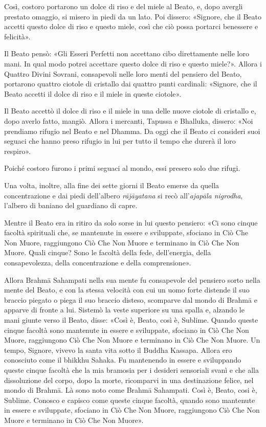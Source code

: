 Così, costoro portarono un dolce di riso e del miele al Beato, e, dopo avergli
prestato omaggio, si misero in piedi da un lato. Poi dissero: «Signore, che il
Beato accetti questo dolce di riso e questo miele, così che ciò possa portarci
benessere e felicità».

Il Beato pensò: «Gli Esseri Perfetti non accettano cibo direttamente nelle loro
mani. In qual modo potrei accettare questo dolce di riso e questo miele?».
Allora i Quattro Divini Sovrani, consapevoli nelle loro menti del pensiero del
Beato, portarono quattro ciotole di cristallo dai quattro punti cardinali:
«Signore, che il Beato accetti il dolce di riso e il miele in queste ciotole».

Il Beato accettò il dolce di riso e il miele in una delle nuove ciotole di
cristallo e, dopo averlo fatto, mangiò. Allora i mercanti, Tapussa e Bhalluka,
dissero: «Noi prendiamo rifugio nel Beato e nel Dhamma. Da oggi che il Beato ci
consideri suoi seguaci che hanno preso rifugio in lui per tutto il tempo che
durerà il loro respiro».

Poiché costoro furono i primi seguaci al mondo, essi presero solo due rifugi.


 Una volta, inoltre, alla fine dei sette giorni il Beato
emerse da quella concentrazione e dai piedi dell’albero \emph{rājāyatana} si
recò all’\emph{ajapāla nigrodha}, l’albero di baniano del guardiano di capre.

 Mentre il Beato era in ritiro da solo sorse in lui questo
pensiero: «Ci sono cinque facoltà spirituali che, se mantenute in essere e
sviluppate, sfociano in Ciò Che Non Muore, raggiungono Ciò Che Non Muore e
terminano in Ciò Che Non Muore. Quali cinque? Sono le facoltà della fede,
dell’energia, della consapevolezza, della concentrazione e della comprensione».

\label{pag45}%
Allora Brahmā Sahampati nella sua mente fu consapevole del pensiero sorto nella
mente del Beato, e con la stessa velocità con cui un uomo forte distende il suo
braccio piegato o piega il suo braccio disteso, scomparve dal mondo di Brahmā e
apparve di fronte a lui. Sistemò la veste superiore su una spalla e, alzando le
mani giunte verso il Beato, disse: «Così è, Beato, così è, Sublime. Quando
queste cinque facoltà sono mantenute in essere e sviluppate, sfociano in Ciò Che
Non Muore, raggiungono Ciò Che Non Muore e terminano in Ciò Che Non Muore. Un
tempo, Signore, vivevo la santa vita sotto il Buddha Kassapa. Allora ero
conosciuto come il bhikkhu Sahaka. Fu mantenendo in essere e sviluppando queste
cinque facoltà che la mia bramosia per i desideri sensoriali svanì e che alla
dissoluzione del corpo, dopo la morte, ricomparvi in una destinazione felice,
nel mondo di Brahmā. Là sono noto come Brahmā Sahampati. Così è, Beato, cosi è,
Sublime. Conosco e capisco come queste cinque facoltà, quando sono mantenute in
essere e sviluppate, sfociano in Ciò Che Non Muore, raggiungono Ciò Che Non
Muore e terminano in Ciò Che Non Muore».

